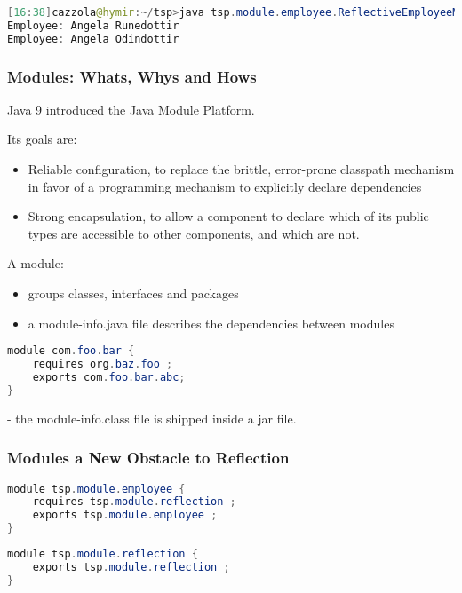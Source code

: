 \begin{lstlisting}[language=Java]
[16:38]cazzola@hymir:~/tsp>java tsp.module.employee.ReflectiveEmployeeMain
Employee: Angela Runedottir
Employee: Angela Odindottir
\end{lstlisting}

\subsubsection{Modules: Whats, Whys and Hows}

Java 9 introduced the Java Module Platform.

Its goals are:

\begin{itemize}
	\item Reliable configuration, to replace the brittle, error-prone classpath mechanism in favor of a programming mechanism to explicitly declare dependencies
	\item Strong encapsulation, to allow a component to declare which of its public types are accessible to other components, and which are not.
\end{itemize}

A module:

\begin{itemize}
	\item groups classes, interfaces and packages
	\item a module-info.java file describes the dependencies between modules
\end{itemize}

\begin{lstlisting}[language=Java]
module com.foo.bar {
	requires org.baz.foo ;
	exports com.foo.bar.abc;
}
\end{lstlisting}

- the module-info.class file is shipped inside a jar file.

\subsubsection{Modules a New Obstacle to Reflection}

\begin{lstlisting}[language=Java]
module tsp.module.employee {
	requires tsp.module.reflection ;
	exports tsp.module.employee ;
}
\end{lstlisting}

\begin{lstlisting}[language=Java]
module tsp.module.reflection {
	exports tsp.module.reflection ;
}
\end{lstlisting}

